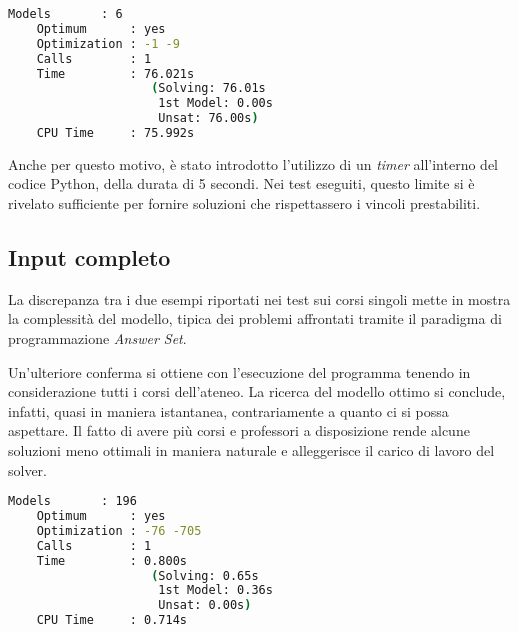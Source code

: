 \begin{lstlisting}[language=bash, captionpos=b, 
    caption={Statistiche clingo per il corso 3024.}, 
    label={lst:stat_3024},
    backgroundcolor=\color{lightgray!20},
    basicstyle=\ttfamily\footnotesize]
    Models       : 6
    Optimum      : yes
    Optimization : -1 -9
    Calls        : 1
    Time         : 76.021s 
                    (Solving: 76.01s 
                     1st Model: 0.00s 
                     Unsat: 76.00s)
    CPU Time     : 75.992s
\end{lstlisting}

Anche per questo motivo, è stato introdotto l'utilizzo di un \textit{timer} all'interno 
del codice Python, della durata di 5 secondi.
Nei test eseguiti, questo limite si è rivelato sufficiente per fornire soluzioni 
che rispettassero i vincoli prestabiliti.

\subsection{Input completo}
La discrepanza tra i due esempi riportati nei test sui corsi singoli mette in 
mostra la complessità del modello, tipica dei problemi affrontati tramite il 
paradigma di programmazione \textit{Answer Set}.

Un'ulteriore conferma si ottiene con l'esecuzione del programma tenendo in 
considerazione tutti i corsi dell'ateneo. La ricerca del modello ottimo 
si conclude, infatti, quasi in maniera istantanea, contrariamente a quanto 
ci si possa aspettare.
Il fatto di avere più corsi e professori a disposizione rende alcune soluzioni 
meno ottimali in maniera naturale e alleggerisce il carico di lavoro del solver.

\begin{lstlisting}[language=bash, captionpos=b, 
    caption={Statistiche clingo per tutti i corsi.}, 
    label={lst:stat_all},
    backgroundcolor=\color{lightgray!20},
    basicstyle=\ttfamily\footnotesize]
    Models       : 196
    Optimum      : yes
    Optimization : -76 -705
    Calls        : 1
    Time         : 0.800s 
                    (Solving: 0.65s 
                     1st Model: 0.36s 
                     Unsat: 0.00s)
    CPU Time     : 0.714s
\end{lstlisting}

